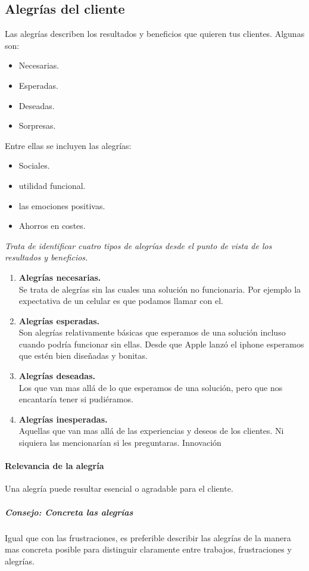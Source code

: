 \documentclass[11pt]{book}
\begin{document}
\subsection{Alegrías del cliente}
Las alegrías describen los resultados y beneficios que quieren tus clientes. Algunas son:
\begin{itemize}
\item Necesarias.
\item Esperadas.
\item Deseadas.
\item Sorpresas.
\end{itemize}
Entre ellas se incluyen las alegrías:
\begin{itemize}
\item Sociales.
\item utilidad funcional.
\item las emociones positivas.
\item Ahorros en costes.
\end{itemize}
\emph{
Trata de identificar cuatro tipos de alegrías desde el punto de vista de los resultados y beneficios.}
\begin{enumerate}
\item\textbf{ Alegrías necesarias.}\\
Se trata de alegrías sin las cuales una solución no funcionaria.
Por ejemplo la expectativa de un celular es que podamos llamar con el.
\item \textbf{Alegrías esperadas.}\\
Son alegrías relativamente básicas que esperamos de una solución incluso cuando podría funcionar sin ellas. Desde que Apple lanzó el iphone esperamos que estén bien diseñadas y bonitas.
\item \textbf{Alegrías deseadas.}\\
Los que van mas allá de lo que esperamos de una solución, pero que nos encantaría tener si pudiéramos.
\item \textbf{Alegrías inesperadas.}\\
Aquellas que van mas allá de las experiencias y deseos de los clientes. Ni siquiera las mencionarían si les preguntaras. Innovación
\end{enumerate}
\paragraph{Relevancia de la alegría}
Una alegría puede resultar esencial o agradable para el cliente.
\subparagraph{Consejo: Concreta las alegrías}
Igual que con las frustraciones, es preferible describir las alegrías de la manera mas concreta posible para distinguir claramente entre trabajos, frustraciones y alegrías.
\end{document}

